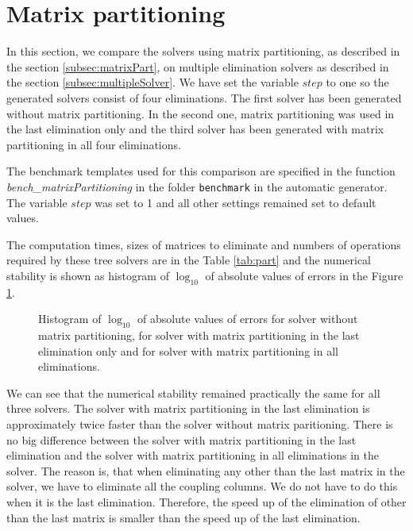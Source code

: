 \section{Matrix partitioning}
\label{exp:part}
In this section, we compare the solvers using matrix partitioning, as described in the section \ref{subsec:matrixPart}, on multiple elimination solvers as described in the section \ref{subsec:multipleSolver}. We have set the variable $step$ to one so the generated solvers consist of four eliminations. The first solver has been generated without matrix partitioning. In the second one, matrix partitioning was used in the last elimination only and the third solver has been generated with matrix partitioning in all four eliminations.

The benchmark templates used for this comparison are specified in the function \textit{bench\_\-mat\-rix\-Partitioning} in the folder \texttt{benchmark} in the automatic generator. The variable $step$ was set to 1 and all other settings remained set to default values.

The computation times, sizes of matrices to eliminate and numbers of operations required by these tree solvers are in the Table \ref{tab:part} and the numerical stability is shown as histogram of $\log_{10}$ of absolute values of errors in the Figure \ref{graph:part}.

\begin{figure}[ht]
  \centering
  \resizebox{0.95\textwidth}{!}{}
  \caption{Histogram of $\log_{10}$ of absolute values of errors for solver without matrix partitioning, for solver with matrix partitioning in the last elimination only and for solver with matrix partitioning in all eliminations.}
  \label{graph:part}
\end{figure}

We can see that the numerical stability remained practically the same for all three solvers. The solver with matrix partitioning in the last elimination is approximately twice faster than the solver without matrix paritioning. There is no big difference between the solver with matrix partitioning in the last elimination and the solver with matrix partitioning in all eliminations in the solver. The reason is, that when eliminating any other than the last matrix in the solver, we have to eliminate all the coupling columns. We do not have to do this when it is the last elimination. Therefore, the speed up of the elimination of other than the last matrix is smaller than the speed up of the last elimination.

